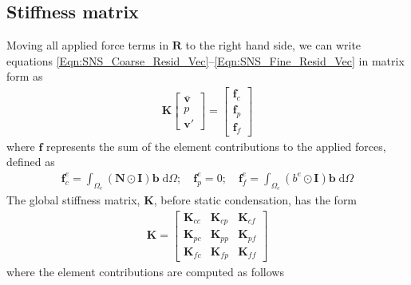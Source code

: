 \documentclass[11pt]{amsart}
\begin{document}
\subsection{Stiffness matrix}
Moving all applied force terms in $\boldsymbol{R}$ to the right hand side, we can write equations \eqref{Eqn:SNS_Coarse_Resid_Vec}--\eqref{Eqn:SNS_Fine_Resid_Vec} in matrix form as
\begin{align}
\label{Eqn:SNS_Matrix_Form_Resid}
  \boldsymbol{K} \left[ \begin{array}{c}  \bar{\boldsymbol{v}} \\
  p \\
  \boldsymbol{v}'  \end{array} \right] = \left[ \begin{array}{c}  \boldsymbol{f}_{c} \\
\boldsymbol{f}_{p} \\
\boldsymbol{f}_{f}  \end{array} \right]
\end{align}
where $\boldsymbol{f}$ represents the sum of the element contributions to the applied forces, defined as
\begin{align}
\boldsymbol{f}_{c}^e = \int_{\Omega_e} (\boldsymbol{N} \odot \boldsymbol{I}) \boldsymbol{b} \; \mathrm{d} \Omega ; \quad \boldsymbol{f}_{p}^e = 0; \quad \boldsymbol{f}_{f}^e = \int_{\Omega_e} ( b^e \odot \boldsymbol{I})\boldsymbol{b} \; \mathrm{d} \Omega
\end{align}
The global stiffness matrix, $\boldsymbol{K}$, before static condensation, has the form
\begin{align}
\label{eq:LinearStiffness}
\boldsymbol{K} = \left[ \begin{array}{ccc} \boldsymbol{K}_{cc} & \boldsymbol{K}_{cp} & \boldsymbol{K}_{cf} \\
 \boldsymbol{K}_{pc}  & \boldsymbol{K}_{pp}  & \boldsymbol{K}_{pf}  \\
 \boldsymbol{K}_{fc}  & \boldsymbol{K}_{fp}  & \boldsymbol{K}_{ff}   \end{array} \right] 
\end{align}
where the element contributions are computed as follows
\end{document}
